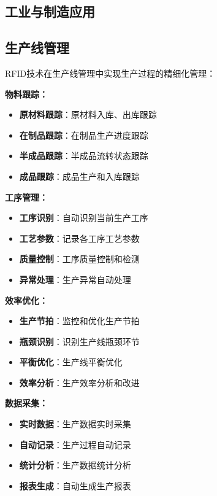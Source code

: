 \documentclass[12pt,UTF8]{ctexbook}
\begin{document}
\begin{itemize}[leftmargin=3.5em]
\begin{itemize}[leftmargin=3.5em]
\begin{itemize}[leftmargin=3.5em]
\begin{itemize}[leftmargin=3.5em]
\chapter{工业与制造应用}

\section{生产线管理}

RFID技术在生产线管理中实现生产过程的精细化管理：

\textbf{物料跟踪：}
\begin{itemize}[leftmargin=3.5em]
    \item \textbf{原材料跟踪}：原材料入库、出库跟踪
    \item \textbf{在制品跟踪}：在制品生产进度跟踪
    \item \textbf{半成品跟踪}：半成品流转状态跟踪
    \item \textbf{成品跟踪}：成品生产和入库跟踪
\end{itemize}

\textbf{工序管理：}
\begin{itemize}[leftmargin=3.5em]
    \item \textbf{工序识别}：自动识别当前生产工序
    \item \textbf{工艺参数}：记录各工序工艺参数
    \item \textbf{质量控制}：工序质量控制和检测
    \item \textbf{异常处理}：生产异常自动处理
\end{itemize}

\textbf{效率优化：}
\begin{itemize}[leftmargin=3.5em]
    \item \textbf{生产节拍}：监控和优化生产节拍
    \item \textbf{瓶颈识别}：识别生产线瓶颈环节
    \item \textbf{平衡优化}：生产线平衡优化
    \item \textbf{效率分析}：生产效率分析和改进
\end{itemize}

\textbf{数据采集：}
\begin{itemize}[leftmargin=3.5em]
    \item \textbf{实时数据}：生产数据实时采集
    \item \textbf{自动记录}：生产过程自动记录
    \item \textbf{统计分析}：生产数据统计分析
    \item \textbf{报表生成}：自动生成生产报表
\end{itemize}


\end{itemize}
\end{itemize}
\end{itemize}
\end{itemize}
\end{document}
